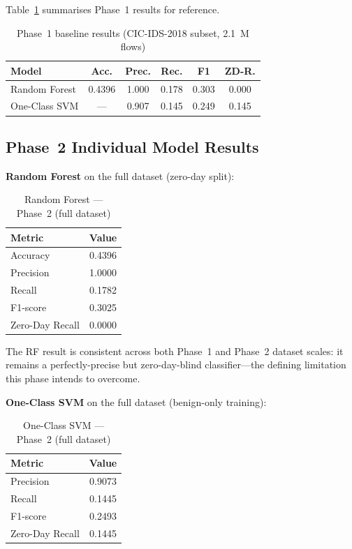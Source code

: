 \documentclass[10pt,conference]{IEEEtran}
\begin{document}
Table~\ref{tab:phase1recap} summarises Phase~1 results for reference.

\begin{table}[H]
\centering
\caption{Phase~1 baseline results (CIC-IDS-2018 subset, 2.1~M flows)}
\label{tab:phase1recap}
\begin{tabular}{lccccc}
\toprule
\textbf{Model} & \textbf{Acc.} & \textbf{Prec.} & \textbf{Rec.} & \textbf{F1} & \textbf{ZD-R.} \\
\midrule
Random Forest & 0.4396 & 1.000 & 0.178 & 0.303 & 0.000 \\
One-Class SVM & ---    & 0.907 & 0.145 & 0.249 & 0.145 \\
\bottomrule
\end{tabular}
\end{table}

\subsection{Phase~2 Individual Model Results}

\textbf{Random Forest} on the full dataset (zero-day split):

\begin{table}[H]
\centering
\caption{Random Forest — Phase~2 (full dataset)}
\label{tab:rf_p2}
\begin{tabular}{lc}
\toprule
\textbf{Metric} & \textbf{Value} \\
\midrule
Accuracy        & 0.4396 \\
Precision       & 1.0000 \\
Recall          & 0.1782 \\
F1-score        & 0.3025 \\
Zero-Day Recall & 0.0000 \\
\bottomrule
\end{tabular}
\end{table}

\noindent The RF result is consistent across both Phase~1 and Phase~2
dataset scales: it remains a perfectly-precise but zero-day-blind
classifier—the defining limitation this phase intends to overcome.

\textbf{One-Class SVM} on the full dataset (benign-only training):

\begin{table}[H]
\centering
\caption{One-Class SVM — Phase~2 (full dataset)}
\label{tab:ocsvm_p2}
\begin{tabular}{lc}
\toprule
\textbf{Metric} & \textbf{Value} \\
\midrule
Precision       & 0.9073 \\
Recall          & 0.1445 \\
F1-score        & 0.2493 \\
Zero-Day Recall & 0.1445 \\
\bottomrule
\end{tabular}
\end{table}
\end{document}
